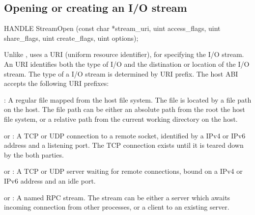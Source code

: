 \subsection*{Opening or creating an I/O stream}




\begin{paldef}
HANDLE StreamOpen (const char *stream_uri,
                   uint access_flags, uint share_flags,
                   uint create_flags, uint options);
\end{paldef}



Unlike ,  uses a URI (uniform resource identifier), for specifying the I/O stream.
An URI identifies both the type of I/O and the distination or location of the I/O stream.
The type of a I/O stream is determined by URI prefix.
The host ABI accepts the following URI prefixes:



\begin{compactitem}

\item {}: A regular file mapped from the host file system. The file is located by a file path on the host. The file path can be either an absolute path from the root the host file system, or a relative path from the current working directory on the host.

\item {} or : A TCP or UDP connection to a remote socket, identified by a IPv4 or IPv6 address and a listening port. The TCP connection exists until it is teared down by the both parties.

\item {} or : A TCP or UDP server waiting for remote connections, bound on a IPv4 or IPv6 address and an idle port.

\item {} or : A named RPC stream.
The stream can be either a server which awaits incoming connection from other processes,
or a client to an existing server.

\end{compactitem}




